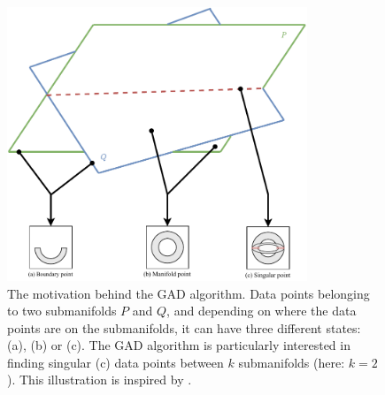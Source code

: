 \begin{figure}[H]
    \centering
    \includegraphics[width=0.8\textwidth]{thesis/figures/geometric-anomaly-detection-motivation_cropped.pdf}
    \caption{The motivation behind the GAD algorithm. Data points belonging to two submanifolds $P$ and $Q$, and depending on where the data points are on the submanifolds, it can have three different states: (a), (b) or (c). The GAD algorithm is particularly interested in finding singular (c) data points between $k$ submanifolds (here: $k=2$). This illustration is inspired by \cite[Figure 1]{stolz2020geometric}.}
    \label{fig:gad-motivation}
\end{figure}

